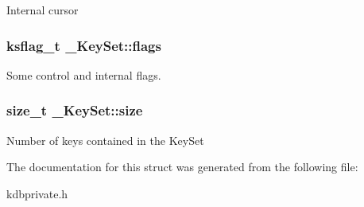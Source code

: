 \label{struct__KeySet_ae1f826d1e8848e43e4432d1bc8316e65}
Internal cursor \hypertarget{struct__KeySet_aa8da9b8e25533547f9eeb4e5c3227c74}{
\subsubsection[{flags}]{\setlength{\rightskip}{0pt plus 5cm}ksflag\_\-t {\bf \_\-KeySet::flags}}}
\label{struct__KeySet_aa8da9b8e25533547f9eeb4e5c3227c74}
Some control and internal flags. \hypertarget{struct__KeySet_aecb83d70eff913f1332593c179185125}{
\subsubsection[{size}]{\setlength{\rightskip}{0pt plus 5cm}size\_\-t {\bf \_\-KeySet::size}}}
\label{struct__KeySet_aecb83d70eff913f1332593c179185125}
Number of keys contained in the KeySet 

The documentation for this struct was generated from the following file:\begin{DoxyCompactItemize}
\item 
kdbprivate.h\end{DoxyCompactItemize}

